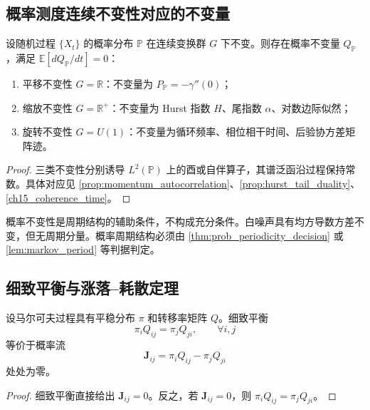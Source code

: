 \subsection{概率测度连续不变性对应的不变量}

\begin{theorem}[概率测度连续不变性对应的不变量]\label{thm:probability_noether}
设随机过程 $\{X_t\}$ 的概率分布 $\mathbb P$ 在连续变换群 $G$ 下不变。则存在概率不变量 $Q_{\mathbb P}$，满足 $\mathbb E[dQ_{\mathbb P}/dt]=0$：
\begin{enumerate}[label=(\roman*)]
    \item 平移不变性 $G=\mathbb R$：不变量为 $P_{\mathbb P}=-\gamma''(0)$；
    \item 缩放不变性 $G=\mathbb R^+$：不变量为 Hurst 指数 $H$、尾指数 $\alpha$、对数边际似然；
    \item 旋转不变性 $G=U(1)$：不变量为循环频率、相位相干时间、后验协方差矩阵迹。
\end{enumerate}
\end{theorem}

\begin{proof}
三类不变性分别诱导 $L^2(\mathbb P)$ 上的酉或自伴算子，其谱泛函沿过程保持常数。具体对应见 \cref{prop:momentum_autocorrelation}、\cref{prop:hurst_tail_duality}、\cref{ch15_coherence_time}。
\end{proof}

\begin{remark}[概率不变性与周期的关系]\label{rem:probability_period_scope}
概率不变性是周期结构的辅助条件，不构成充分条件。白噪声具有均方导数方差不变，但无周期分量。概率周期结构必须由 \cref{thm:prob_periodicity_decision} 或 \cref{lem:markov_period} 等判据判定。
\end{remark}

\subsection{细致平衡与涨落--耗散定理}

\begin{proposition}[细致平衡与概率流闭合]\label{prop:detailed_balance_curl}
设马尔可夫过程具有平稳分布 $\pi$ 和转移率矩阵 $Q$。细致平衡
\[
\pi_iQ_{ij}=\pi_jQ_{ji},\qquad \forall i,j
\]
等价于概率流
\[
\mathbf J_{ij}=\pi_iQ_{ij}-\pi_jQ_{ji}
\]
处处为零。
\end{proposition}

\begin{proof}
细致平衡直接给出 $\mathbf J_{ij}=0$。反之，若 $\mathbf J_{ij}=0$，则 $\pi_iQ_{ij}=\pi_jQ_{ji}$。
\end{proof}

